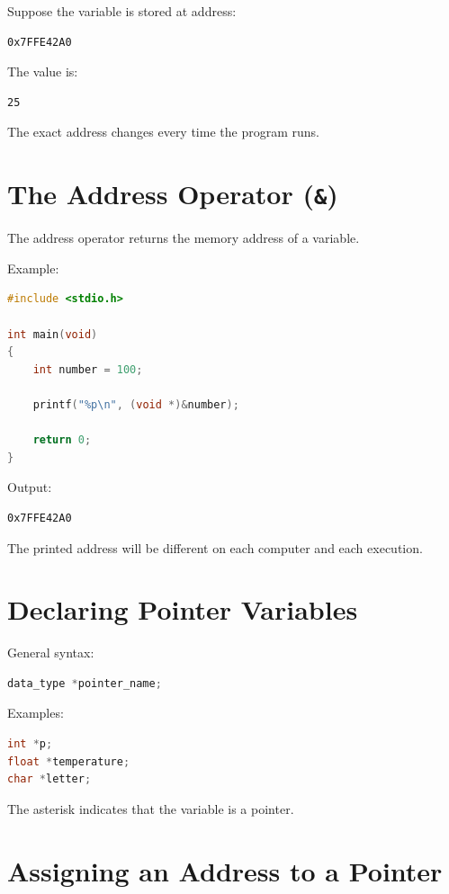 \documentclass[12pt,openany]{book}
\begin{document}
Suppose the variable is stored at address:

\begin{lstlisting}
0x7FFE42A0
\end{lstlisting}

The value is:

\begin{lstlisting}
25
\end{lstlisting}

The exact address changes every time the program runs.

\section{The Address Operator (\texttt{\&})}

The address operator returns the memory address of a variable.

Example:

\begin{lstlisting}[language=C]
#include <stdio.h>

int main(void)
{
    int number = 100;

    printf("%p\n", (void *)&number);

    return 0;
}
\end{lstlisting}

Output:

\begin{lstlisting}
0x7FFE42A0
\end{lstlisting}

The printed address will be different on each computer and each execution.
\section{Declaring Pointer Variables}

General syntax:

\begin{lstlisting}[language=C]
data_type *pointer_name;
\end{lstlisting}

Examples:

\begin{lstlisting}[language=C]
int *p;
float *temperature;
char *letter;
\end{lstlisting}

The asterisk indicates that the variable is a pointer.

\section{Assigning an Address to a Pointer}
\end{document}
